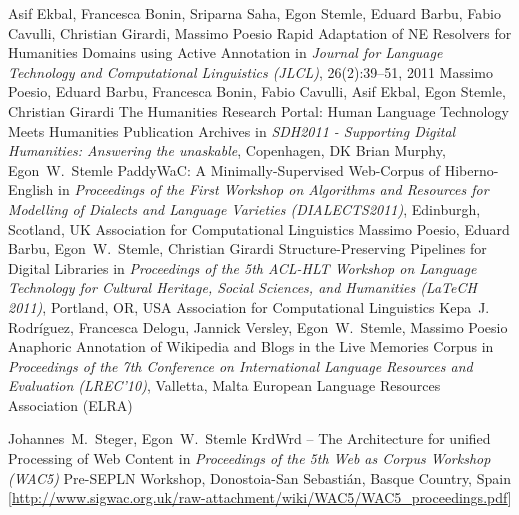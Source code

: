 \documentclass[11pt,a4paper]{moderncv}
\begin{document}

        {Asif Ekbal, Francesca Bonin, Sriparna Saha, Egon Stemle, Eduard Barbu,
        Fabio Cavulli, Christian Girardi, Massimo Poesio}
        {\small Rapid Adaptation of NE Resolvers for Humanities Domains using
        Active Annotation}
        {\small in {\em Journal for Language Technology and Computational Linguistics (JLCL)},
        26(2):39--51, 2011}
        {}
        {}
        {Massimo Poesio, Eduard Barbu, Francesca Bonin, Fabio Cavulli, Asif
        Ekbal, Egon Stemle, Christian Girardi}
        {\small The Humanities Research Portal: Human Language Technology Meets
        Humanities Publication Archives}
        {\small in {\em SDH2011 - Supporting Digital Humanities: Answering the
        unaskable}, Copenhagen, DK}
        {}
        {}
        {Brian Murphy, Egon~W.~Stemle}
        {\small PaddyWaC: A Minimally-Supervised Web-Corpus of Hiberno-English}
        {\small in {\em Proceedings of the First Workshop on Algorithms and
        Resources for Modelling of Dialects and Language Varieties
        (DIALECTS2011)}, Edinburgh, Scotland, UK}
        {\small Association for Computational Linguistics}
        {}
        {Massimo Poesio, Eduard Barbu, Egon~W.~Stemle, Christian Girardi}
        {Structure-Preserving Pipelines for Digital Libraries}
        {\small in {\em Proceedings of the 5th ACL-HLT Workshop on Language
        Technology for Cultural Heritage, Social Sciences, and Humanities
        (LaTeCH 2011)}, Portland, OR, USA}
        {\small Association for Computational Linguistics}
        {}
        {Kepa~J. Rodr{\'i}guez, Francesca Delogu, Jannick Versley,
        Egon~W.~Stemle, Massimo Poesio} {Anaphoric Annotation of Wikipedia
        and Blogs in the Live Memories Corpus}
        {\small in {\em Proceedings of the 7th Conference on International
        Language Resources and Evaluation (LREC'10)}, Valletta, Malta}
        {\small European Language Resources Association (ELRA)}
        {}

        {Johannes~M.~Steger, Egon~W.~Stemle}
        {{KrdWrd} -- The Architecture for unified Processing of Web Content}
        {\small in {\em Proceedings of the 5th Web as Corpus Workshop (WAC5)}}
        {\small Pre-SEPLN Workshop, Donostoia-San Sebasti{\'a}n, Basque
        Country, Spain}
        {[\url{http://www.sigwac.org.uk/raw-attachment/wiki/WAC5/WAC5_proceedings.pdf}]}
\end{document}
